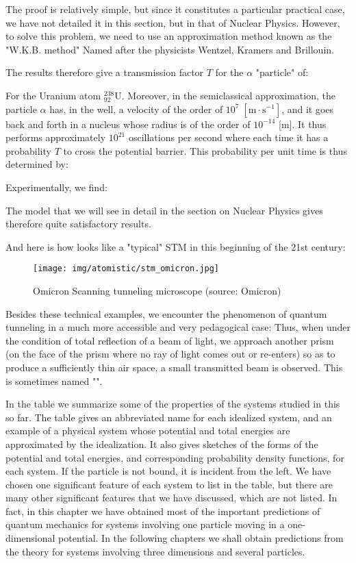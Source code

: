 	The proof is relatively simple, but since it constitutes a particular practical case, we have not detailed it in this section, but in that of Nuclear Physics. However, to solve this problem, we need to use an approximation method known as the "W.K.B. method" Named after the physicists Wentzel, Kramers and Brillouin.
	
	The results therefore give a transmission factor $T$ for the $\alpha$ "particle" of:
	
	For the Uranium atom $_{92}^{238}\mathrm{U}$. Moreover, in the semiclassical approximation, the particle $\alpha$ has, in the well, a velocity of the order of $10^7\;[\text{m}\cdot\text{s}^{-1}]$, and it goes back and forth in a nucleus whose radius is of the order of $10^{-14}$ [m]. It thus performs approximately $10^{21}$ oscillations per second where each time it has a probability $T$ to cross the potential barrier. This probability per unit time is thus determined by:
	
	Experimentally, we find:
	
	The model that we will see in detail in the section on Nuclear Physics gives therefore quite satisfactory results.
	
	And here is how looks like  a "typical" STM in this beginning of the 21st century:
	\begin{figure}[H]
		\centering
		\texttt{[image: img/atomistic/stm\_omicron.jpg]}	
		\caption[Omicron Scanning tunneling microscope]{Omicron Scanning tunneling microscope (source: Omicron)}
	\end{figure}
	Besides these technical examples, we encounter the phenomenon of quantum tunneling in a much more accessible and very pedagogical case: Thus, when under the condition of total reflection of a beam of light, we approach another prism (on the face of the prism where no ray of light comes out or re-enters) so as to produce a sufficiently thin air space, a small transmitted beam is observed. This is sometimes named "".
	
	In the table we summarize some of the properties of the systems studied in this so far. The table gives an abbreviated name for each idealized system, and an example of a physical system whose potential and total energies are approximated by the idealization. It also gives sketches of the forms of the potential and total energies, and corresponding probability density functions, for each system. If the particle is not bound, it is incident from the left. We have chosen one significant feature of each system to list in the table, but there are many other significant features that we have discussed, which are not listed. In fact, in this chapter we have obtained most of the important predictions of quantum mechanics for systems involving one particle moving in a one-dimensional potential. In the following chapters we shall obtain predictions from the theory for systems involving three dimensions and several particles.
	
